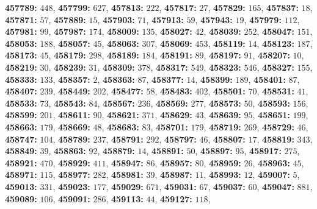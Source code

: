 \textsf{\bfseries 457789:} $448$, \textsf{\bfseries 457799:} $627$, \textsf{\bfseries 457813:} $222$, \textsf{\bfseries 457817:} $27$, \textsf{\bfseries 457829:} $165$, \textsf{\bfseries 457837:} $18$, \textsf{\bfseries 457871:} $57$, \textsf{\bfseries 457889:} $15$, \textsf{\bfseries 457903:} $71$, \textsf{\bfseries 457913:} $59$, \textsf{\bfseries 457943:} $19$, \textsf{\bfseries 457979:} $112$, \textsf{\bfseries 457981:} $99$, \textsf{\bfseries 457987:} $174$, \textsf{\bfseries 458009:} $135$, \textsf{\bfseries 458027:} $42$, \textsf{\bfseries 458039:} $252$, \textsf{\bfseries 458047:} $151$, \textsf{\bfseries 458053:} $188$, \textsf{\bfseries 458057:} $45$, \textsf{\bfseries 458063:} $307$, \textsf{\bfseries 458069:} $453$, \textsf{\bfseries 458119:} $14$, \textsf{\bfseries 458123:} $187$, \textsf{\bfseries 458173:} $45$, \textsf{\bfseries 458179:} $298$, \textsf{\bfseries 458189:} $184$, \textsf{\bfseries 458191:} $89$, \textsf{\bfseries 458197:} $91$, \textsf{\bfseries 458207:} $10$, \textsf{\bfseries 458219:} $30$, \textsf{\bfseries 458239:} $31$, \textsf{\bfseries 458309:} $378$, \textsf{\bfseries 458317:} $549$, \textsf{\bfseries 458323:} $546$, \textsf{\bfseries 458327:} $155$, \textsf{\bfseries 458333:} $133$, \textsf{\bfseries 458357:} $2$, \textsf{\bfseries 458363:} $87$, \textsf{\bfseries 458377:} $14$, \textsf{\bfseries 458399:} $189$, \textsf{\bfseries 458401:} $87$, \textsf{\bfseries 458407:} $239$, \textsf{\bfseries 458449:} $202$, \textsf{\bfseries 458477:} $58$, \textsf{\bfseries 458483:} $402$, \textsf{\bfseries 458501:} $70$, \textsf{\bfseries 458531:} $41$, \textsf{\bfseries 458533:} $73$, \textsf{\bfseries 458543:} $84$, \textsf{\bfseries 458567:} $236$, \textsf{\bfseries 458569:} $277$, \textsf{\bfseries 458573:} $50$, \textsf{\bfseries 458593:} $156$, \textsf{\bfseries 458599:} $201$, \textsf{\bfseries 458611:} $90$, \textsf{\bfseries 458621:} $371$, \textsf{\bfseries 458629:} $43$, \textsf{\bfseries 458639:} $95$, \textsf{\bfseries 458651:} $199$, \textsf{\bfseries 458663:} $179$, \textsf{\bfseries 458669:} $48$, \textsf{\bfseries 458683:} $83$, \textsf{\bfseries 458701:} $179$, \textsf{\bfseries 458719:} $269$, \textsf{\bfseries 458729:} $46$, \textsf{\bfseries 458747:} $104$, \textsf{\bfseries 458789:} $237$, \textsf{\bfseries 458791:} $292$, \textsf{\bfseries 458797:} $46$, \textsf{\bfseries 458807:} $17$, \textsf{\bfseries 458819:} $343$, \textsf{\bfseries 458849:} $39$, \textsf{\bfseries 458863:} $92$, \textsf{\bfseries 458879:} $14$, \textsf{\bfseries 458891:} $50$, \textsf{\bfseries 458897:} $95$, \textsf{\bfseries 458917:} $275$, \textsf{\bfseries 458921:} $470$, \textsf{\bfseries 458929:} $411$, \textsf{\bfseries 458947:} $86$, \textsf{\bfseries 458957:} $80$, \textsf{\bfseries 458959:} $26$, \textsf{\bfseries 458963:} $45$, \textsf{\bfseries 458971:} $115$, \textsf{\bfseries 458977:} $282$, \textsf{\bfseries 458981:} $39$, \textsf{\bfseries 458987:} $11$, \textsf{\bfseries 458993:} $12$, \textsf{\bfseries 459007:} $5$, \textsf{\bfseries 459013:} $331$, \textsf{\bfseries 459023:} $177$, \textsf{\bfseries 459029:} $671$, \textsf{\bfseries 459031:} $67$, \textsf{\bfseries 459037:} $60$, \textsf{\bfseries 459047:} $881$, \textsf{\bfseries 459089:} $106$, \textsf{\bfseries 459091:} $286$, \textsf{\bfseries 459113:} $44$, \textsf{\bfseries 459127:} $118$, 
